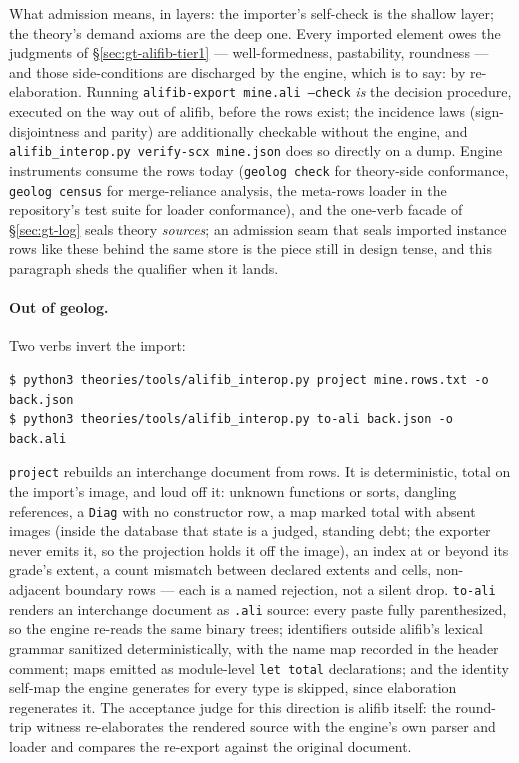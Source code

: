 What admission means, in layers: the importer's self-check is the
shallow layer; the theory's demand axioms are the deep one. Every
imported element owes the judgments of
\S\ref{sec:gt-alifib-tier1} --- well-formedness, pastability,
roundness --- and those side-conditions are discharged by the engine,
which is to say: by re-elaboration. Running
\texttt{alifib-export mine.ali --check} \emph{is} the decision
procedure, executed on the way out of alifib, before the rows exist;
the incidence laws (sign-disjointness and parity) are additionally
checkable without the engine, and
\texttt{alifib\_interop.py verify-scx mine.json} does so directly on a
dump. Engine instruments consume the rows today
(\texttt{geolog check} for theory-side conformance,
\texttt{geolog census} for merge-reliance analysis, the
meta-rows loader in the repository's test suite for loader
conformance), and the one-verb facade of \S\ref{sec:gt-log} seals
theory \emph{sources}; an admission seam that seals imported instance
rows like these behind the same store is the piece still in design
tense, and this paragraph sheds the qualifier when it lands.

\paragraph{Out of geolog.} Two verbs invert the import:

\begin{Verbatim}[fontsize=\small,frame=leftline,rulecolor=\color{accentmid},framesep=3mm,xleftmargin=3mm]
$ python3 theories/tools/alifib_interop.py project mine.rows.txt -o back.json
$ python3 theories/tools/alifib_interop.py to-ali back.json -o back.ali
\end{Verbatim}

\noindent \texttt{project} rebuilds an interchange document from rows.
It is deterministic, total on the import's image, and loud off it:
unknown functions or sorts, dangling references, a \texttt{Diag} with
no constructor row, a map marked total with absent images (inside the
database that state is a judged, standing debt; the exporter never
emits it, so the projection holds it off the image), an index at or
beyond its grade's extent, a count mismatch between declared extents
and cells, non-adjacent boundary rows --- each is a named rejection,
not a silent drop. \texttt{to-ali} renders an interchange document as
\texttt{.ali} source: every paste fully parenthesized, so the engine
re-reads the same binary trees; identifiers outside alifib's lexical
grammar sanitized deterministically, with the name map recorded in the
header comment; maps emitted as module-level \texttt{let total}
declarations; and the identity self-map the engine generates for every
type is skipped, since elaboration regenerates it. The acceptance
judge for this direction is alifib itself: the round-trip witness
re-elaborates the rendered source with the engine's own parser and
loader and compares the re-export against the original document.

